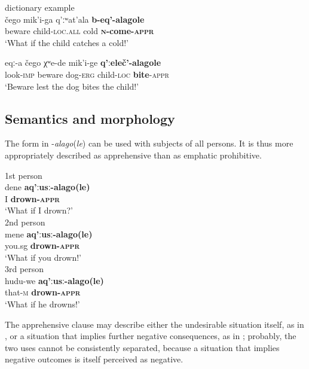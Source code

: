 \documentclass[output=paper,colorlinks,citecolor=brown]{langscibook}
\begin{document}
\ea \label{ex:DD65} \textnormal{dictionary example} \\
\gll čego mik'i-ga q'ːʷat'ala \textbf{b-eq'-alagole} \\
beware child-\textsc{loc.all} cold \textbf{\textsc{n}-come-\textsc{appr}} \\
\glt `What if the child catches a cold!'
\z

\ea \label{ex:DD66}
\gll eqː-a čego χʷe-de mik'i-ge \textbf{q'ːeleč'-alagole} \\
look-\textsc{imp} beware dog-\textsc{erg} child-\textsc{loc} \textbf{bite}-\textsc{appr} \\
\glt `Beware lest the dog bites the child!'
\z





\subsection{Semantics and morphology}
\label{subsec:NAsem}
 
The form in \nobreakdash-\textit{alago}(\textit{le}) can be used with subjects of all persons. It is thus more appropriately described as apprehensive than as emphatic prohibitive.

\ea \label{ex:DD67}
\ea \label{ex:DD67a} \textnormal{1st person} \\
\gll dene \textbf{aq'ːusː-alago\textup{(}le\textup{)}} \\
I \textbf{drown-\textsc{appr}} \\
\glt `What if I drown?' \\
\ex \label{ex:DD67b} \textnormal{2nd person} \\
\gll mene \textbf{aq'ːusː-alago\textup{(}le\textup{)}} \\
you.sg \textbf{drown-\textsc{appr}} \\
\glt `What if you drown!' \\
\ex \label{ex:DD67c} \textnormal{3rd person} \\
\gll hudu-we \textbf{aq'ːusː-alago\textup{(}le\textup{)}} \\
that-\textsc{m} \textbf{drown-\textsc{appr}} \\
\glt `What if he drowns!'
\z
\z

 The apprehensive clause may describe either the undesirable situation itself, as in , or a situation that implies further negative consequences, as in ; probably, the two uses cannot be consistently separated, because a situation that implies negative outcomes is itself perceived as negative. 
\end{document}
